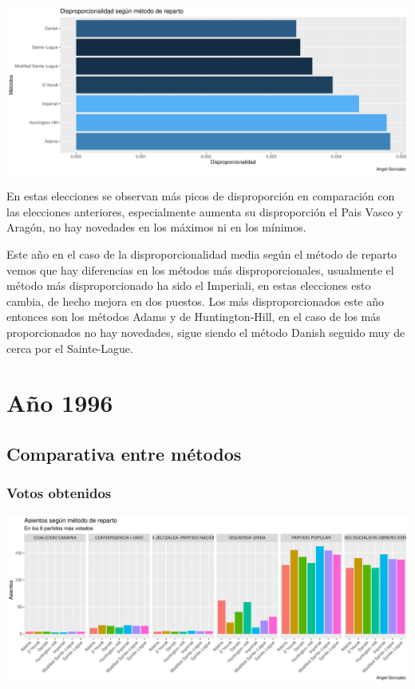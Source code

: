 \documentclass[12pt,a4paper,]{book}
\numberwithin{dummy}{section}
\theoremstyle{ocrenumbox}
\theoremstyle{blacknumex}
\theoremstyle{blacknumbox}
\theoremstyle{ocrenum}
\theoremstyle{ocrenum}
\begin{document}
\begin{center}\includegraphics[width=0.95\linewidth]{figurasR/unnamed-chunk-105-2} \end{center}

En estas elecciones se observan más picos de disproporción en
comparación con las elecciones anteriores, especialmente aumenta su
disproporción el Pais Vasco y Aragón, no hay novedades en los máximos ni
en los mínimos.

Este año en el caso de la disproporcionalidad media según el método de
reparto vemos que hay diferencias en los métodos más disproporcionales,
usualmente el método más disproporcionado ha sido el Imperiali, en estas
elecciones esto cambia, de hecho mejora en dos puestos. Los más
disproporcionados este año entonces son los métodos Adams y de
Huntington-Hill, en el caso de los más proporcionados no hay novedades,
sigue siendo el método Danish seguido muy de cerca por el Sainte-Lague.

\hypertarget{auxf1o-1996}{%
\section{Año 1996}\label{auxf1o-1996}}

\hypertarget{comparativa-entre-muxe9todos-6}{%
\subsection{Comparativa entre
métodos}\label{comparativa-entre-muxe9todos-6}}

\hypertarget{votos-obtenidos-6}{%
\subsubsection{Votos obtenidos}\label{votos-obtenidos-6}}

\begin{center}\includegraphics[width=0.95\linewidth]{figurasR/unnamed-chunk-113-1} \end{center}
\end{document}

